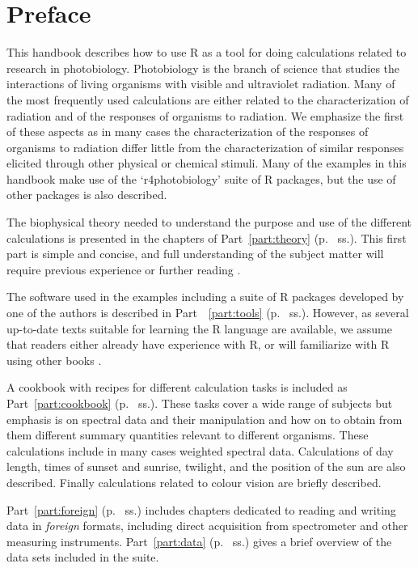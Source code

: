 \chapter{Preface}

This handbook describes how to use R as a tool for doing calculations related to research in photobiology. Photobiology is the branch of science that studies the interactions of living organisms with visible and ultraviolet radiation. Many of the most frequently used calculations are either related to the characterization of radiation and of the responses of organisms to radiation. We emphasize the first of these aspects as in many cases the characterization of the responses of organisms to radiation differ little from the characterization of similar responses elicited through other physical or chemical stimuli.
Many of the examples in this handbook make use of the `r4photobiology'  suite of R packages, but the use of other packages is also described.

The biophysical theory needed to understand the purpose and use of the different calculations is presented in the chapters of Part~\ref{part:theory} (p.~\pageref{part:theory} ss.). This first part is simple and concise, and full understanding of the subject matter will require previous experience or further reading \autocite[e.g.][]{Aphalo2012,Bjoern2015}.

The software used in the examples including a suite of R packages developed by one of the authors is described in Part~~\ref{part:tools} (p.~\pageref{part:tools} ss.). However, as several up-to-date texts suitable for learning the R language are available, we assume that readers either already have experience with R, or will familiarize with R using other books \autocite[e.g.][]{Aphalo2016,Horton2015a,Paradis2005,Peng2016}.

A cookbook with recipes for different calculation tasks is included as Part~\ref{part:cookbook} (p.~\pageref{part:cookbook} ss.). These tasks cover a wide range of subjects but emphasis is on spectral data and their manipulation and how on to obtain from them different summary quantities relevant to different organisms. These calculations include in many cases weighted spectral data. Calculations of day length, times of sunset and sunrise, twilight, and the position of the sun are also described. Finally calculations related to colour vision are briefly described.

Part~\ref{part:foreign} (p.~\pageref{part:foreign} ss.) includes chapters dedicated to reading and writing data in \emph{foreign} formats, including direct acquisition from spectrometer and other measuring instruments. Part~\ref{part:data} (p.~\pageref{part:data} ss.) gives a brief overview of the data sets included in the suite.

